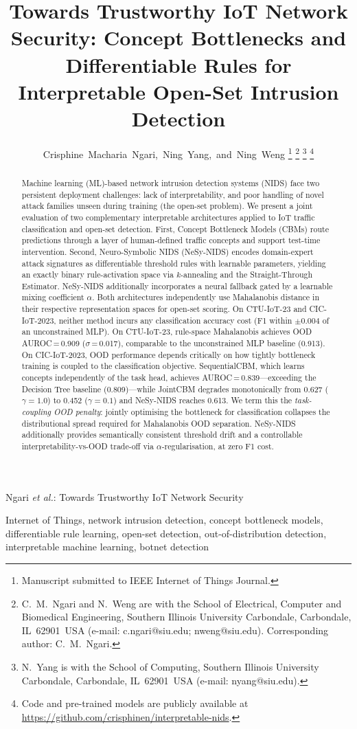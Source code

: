 \documentclass[journal]{IEEEtran}
\title{Towards Trustworthy IoT Network Security: Concept Bottlenecks
  and Differentiable Rules for Interpretable Open-Set Intrusion Detection}
\author{Crisphine~Macharia~Ngari,~Ning~Yang,~and~Ning~Weng%
  \thanks{Manuscript submitted to IEEE Internet of Things Journal.}%
  \thanks{C.~M.~Ngari and N.~Weng are with the School of Electrical,
    Computer and Biomedical Engineering, Southern Illinois University
    Carbondale, Carbondale, IL~62901~USA
    (e-mail: c.ngari@siu.edu; nweng@siu.edu).
    Corresponding author: C.~M.~Ngari.}%
  \thanks{N.~Yang is with the School of Computing, Southern Illinois
    University Carbondale, Carbondale, IL~62901~USA
    (e-mail: nyang@siu.edu).}%
  \thanks{Code and pre-trained models are publicly available at
    \url{https://github.com/crisphinen/interpretable-nids}.}%
}
\begin{document}
%
{Ngari \MakeLowercase{\textit{et al.}}: Towards Trustworthy IoT Network Security}

\maketitle

\begin{abstract}
Machine learning (ML)-based network intrusion detection systems (NIDS)
face two persistent deployment challenges: lack of interpretability, and
poor handling of novel attack families unseen during training (the
open-set problem). We present a joint evaluation of two complementary
interpretable architectures applied to IoT traffic classification and
open-set detection. First, Concept Bottleneck Models (CBMs) route
predictions through a layer of human-defined traffic concepts and
support test-time intervention. Second, Neuro-Symbolic NIDS (NeSy-NIDS)
encodes domain-expert attack signatures as differentiable threshold
rules with learnable parameters, yielding an exactly binary
rule-activation space via $k$-annealing and the Straight-Through
Estimator. NeSy-NIDS additionally incorporates a neural fallback gated
by a learnable mixing coefficient $\alpha$. Both architectures
independently use Mahalanobis distance in their respective
representation spaces for open-set scoring. On CTU-IoT-23 and
CIC-IoT-2023, neither method incurs any classification accuracy cost
(F1 within $\pm0.004$ of an unconstrained MLP). On CTU-IoT-23,
rule-space Mahalanobis achieves OOD AUROC\,=\,0.909
($\sigma$\,=\,0.017), comparable to the unconstrained MLP baseline (0.913).
On CIC-IoT-2023, OOD performance depends critically on how tightly
bottleneck training is coupled to the classification objective.
SequentialCBM, which learns concepts independently of the task head,
achieves AUROC\,=\,0.839---exceeding the Decision Tree baseline
(0.809)---while JointCBM degrades monotonically from 0.627
($\gamma{=}1.0$) to 0.452 ($\gamma{=}0.1$) and NeSy-NIDS reaches
0.613. We term this the \emph{task-coupling OOD penalty}: jointly
optimising the bottleneck for classification collapses the
distributional spread required for Mahalanobis OOD separation. NeSy-NIDS
additionally provides semantically consistent threshold drift and a
controllable interpretability-vs-OOD trade-off via
$\alpha$-regularisation, at zero F1 cost.
\end{abstract}

\begin{IEEEkeywords}
Internet of Things, network intrusion detection, concept bottleneck models,
differentiable rule learning, open-set detection, out-of-distribution detection,
interpretable machine learning, botnet detection
\end{IEEEkeywords}
\end{document}
